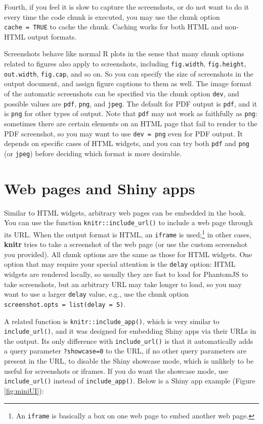 \documentclass[
  12pt,
]{krantz}
\theoremstyle{definition}
\theoremstyle{definition}
\theoremstyle{definition}
\theoremstyle{definition}
\theoremstyle{remark}
\begin{document}
Fourth, if you feel it is slow to capture the screenshots, or do not want to do it every time the code chunk is executed, you may use the chunk option \texttt{cache\ =\ TRUE} to cache the chunk. Caching works for both HTML and non-HTML output formats.

Screenshots behave like normal R plots in the sense that many chunk options related to figures also apply to screenshots, including \texttt{fig.width}, \texttt{fig.height}, \texttt{out.width}, \texttt{fig.cap}, and so on. So you can specify the size of screenshots in the output document, and assign figure captions to them as well. The image format of the automatic screenshots can be specified via the chunk option \texttt{dev}, and possible values are \texttt{pdf}, \texttt{png}, and \texttt{jpeg}. The default for PDF output is \texttt{pdf}, and it is \texttt{png} for other types of output. Note that \texttt{pdf} may not work as faithfully as \texttt{png}: sometimes there are certain elements on an HTML page that fail to render to the PDF screenshot, so you may want to use \texttt{dev\ =\ \textquotesingle{}png\textquotesingle{}} even for PDF output. It depends on specific cases of HTML widgets, and you can try both \texttt{pdf} and \texttt{png} (or \texttt{jpeg}) before deciding which format is more desirable.

\section{Web pages and Shiny apps}\label{web-pages-and-shiny-apps}

Similar to HTML widgets, arbitrary web pages can be embedded in the book. You can use the function \texttt{knitr::include\_url()} to include a web page through its URL. When the output format is HTML, an \texttt{iframe} is used;\footnote{An \texttt{iframe} is basically a box on one web page to embed another web page.} in other cases, \textbf{knitr} tries to take a screenshot of the web page (or use the custom screenshot you provided). All chunk options are the same as those for HTML widgets. One option that may require your special attention is the \texttt{delay} option: HTML widgets are rendered locally, so usually they are fast to load for PhantomJS to take screenshots, but an arbitrary URL may take longer to load, so you may want to use a larger \texttt{delay} value, e.g., use the chunk option \texttt{screenshot.opts\ =\ list(delay\ =\ 5)}.

A related function is \texttt{knitr::include\_app()}, which is very similar to \texttt{include\_url()}, and it was designed for embedding Shiny apps via their URLs in the output. Its only difference with \texttt{include\_url()} is that it automatically adds a query parameter \texttt{?showcase=0} to the URL, if no other query parameters are present in the URL, to disable the Shiny showcase mode, which is unlikely to be useful for screenshots or iframes. If you do want the showcase mode, use \texttt{include\_url()} instead of \texttt{include\_app()}. Below is a Shiny app example (Figure \ref{fig:miniUI}):
\end{document}
